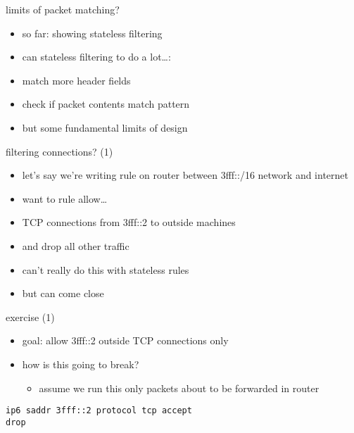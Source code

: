 \begin{frame}{limits of packet matching?}
    \begin{itemize}
    \item so far: showing stateless filtering
    \vspace{.5cm}
    \item can stateless filtering to do a lot\ldots:
    \item match more header fields
    \item check if packet contents match pattern
    \vspace{.5cm}
    \item but some fundamental limits of design
    \end{itemize}
\end{frame}

\begin{frame}[fragile]{filtering connections? (1)}
    \begin{itemize}
    \item let's say we're writing rule on router between 3fff::/16 network
    and internet
    \item want to rule allow\ldots
    \item TCP connections from 3fff::2 to outside machines
    \item and drop all other traffic
    \vspace{.5cm}
    \item can't really do this with stateless rules
    \item but can come close
    \end{itemize}
\end{frame}

\begin{frame}[fragile]{exercise (1)}
\begin{itemize}
\item goal: allow 3fff::2 outside TCP connections only
\item how is this going to break?
    \begin{itemize}
    \item assume we run this only packets about to be forwarded in router
    \end{itemize}
\end{itemize}
\begin{Verbatim}[fontsize=\small]
ip6 saddr 3fff::2 protocol tcp accept
drop
\end{Verbatim}
\end{frame}

